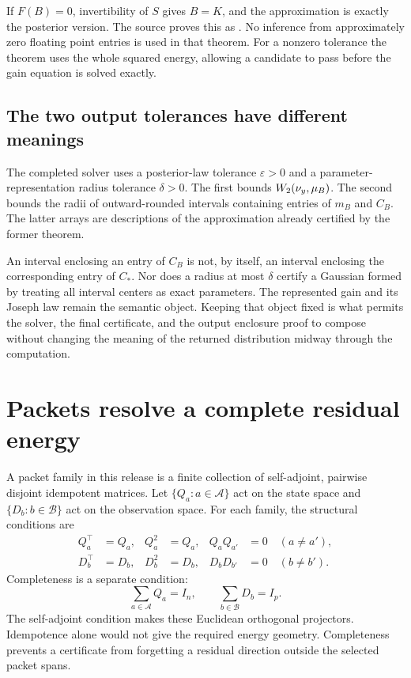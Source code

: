 If $F(B)=0$, invertibility of $S$ gives $B=K$, and the approximation is exactly the posterior version. The source proves this as . No inference from approximately zero floating point entries is used in that theorem. For a nonzero tolerance the theorem uses the whole squared energy, allowing a candidate to pass before the gain equation is solved exactly.

\subsection{The two output tolerances have different meanings}

The completed solver uses a posterior-law tolerance $\varepsilon>0$ and a parameter-representation radius tolerance $\delta>0$. The first bounds $W_2(\nu_y,\mu_B)$. The second bounds the radii of outward-rounded intervals containing entries of $m_B$ and $C_B$. The latter arrays are descriptions of the approximation already certified by the former theorem.

An interval enclosing an entry of $C_B$ is not, by itself, an interval enclosing the corresponding entry of $C_*$. Nor does a radius at most $\delta$ certify a Gaussian formed by treating all interval centers as exact parameters. The represented gain and its Joseph law remain the semantic object. Keeping that object fixed is what permits the solver, the final certificate, and the output enclosure proof to compose without changing the meaning of the returned distribution midway through the computation.

\section{Packets resolve a complete residual energy}
\label{sec:foundation-packets}

A packet family in this release is a finite collection of self-adjoint, pairwise disjoint idempotent matrices. Let $\{Q_a:a\in\mathcal A\}$ act on the state space and $\{D_b:b\in\mathcal B\}$ act on the observation space. For each family, the structural conditions are
\begin{align}
 Q_a^\top&=Q_a,& Q_a^2&=Q_a,& Q_aQ_{a'}&=0\quad(a\ne a'),\label{eq:foundation-output-packets}\\
 D_b^\top&=D_b,& D_b^2&=D_b,& D_bD_{b'}&=0\quad(b\ne b').\label{eq:foundation-input-packets}
\end{align}
Completeness is a separate condition:
\begin{equation}
 \sum_{a\in\mathcal A}Q_a=I_n,\qquad
 \sum_{b\in\mathcal B}D_b=I_p.
 \label{eq:foundation-packet-complete}
\end{equation}
The self-adjoint condition makes these Euclidean orthogonal projectors. Idempotence alone would not give the required energy geometry. Completeness prevents a certificate from forgetting a residual direction outside the selected packet spans.

